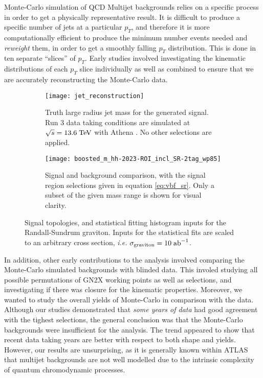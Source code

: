 \documentclass[12pt]{article}
\begin{document}
Monte-Carlo simulation of QCD Multijet backgrounds relies on a specific process
in order to get a physically representative result. It is difficult to produce a
specific number of jets at a particular $p_T$, and therefore it is more
computationally efficient to produce the minimum number events needed and
\textit{reweight} them, in order to get a smoothly falling $p_T$ distribution.
This is done in ten separate ``slices'' of $p_T$. Early studies involved
investigating the kinematic distributions of each $p_T$ slice individually as
well as combined to ensure that we are accurately reconstructing the Monte-Carlo
data.

\begin{figure}[t]
    \centering
    \begin{subfigure}[t]{.48\textwidth}
        \centering
        \texttt{[image: jet\_reconstruction]}
        \caption{Truth large radius jet mass for the generated signal. Run 3
        data taking conditions are simulated at $\sqrt{s}=13.6\;\text{TeV}$ with
        Athena \cite{atlas_simulation}. No other selections are applied.}
        \label{subfig:jet_reconstruction}
    \end{subfigure}
    \hfill
    \begin{subfigure}[t]{.48\textwidth}
        \centering
        \texttt{[image: boosted\_m\_hh-2023-ROI\_incl\_SR-2tag\_wp85]}
        \caption{Signal and background comparison, with the signal region
        selections given in equation \ref{eq:vbf_sr}. Only a subset of the given
        mass range is shown for visual clarity.}
        \label{subfig:input_hists}
    \end{subfigure}
    \caption{Signal topologies, and statistical fitting histogram inputs for the
    Randall-Sundrum graviton. Inputs for the statistical fits are scaled to an
    arbitrary cross section, \textit{i.e.}
    $\sigma_{\text{graviton}}=10\;\text{ab}^{-1}$.}
\label{fig:my_contributions}
\end{figure}

In addition, other early contributions to the analysis involved comparing the
Monte-Carlo simulated backgrounds with blinded data. This involed studying all
possible permutations of GN2X working points as well as selections, and
investigating if there was closure for the kinematic properties. Moreover, we
wanted to study the overall yields of Monte-Carlo in comparison with the data. Although our
studies demonstrated that \textit{some years of data} had good agreement with
the tighest selections, the general conclusion was that the Monte-Carlo
backgrounds were insufficient for the analysis. The trend appeared to show that
recent data taking years are better with respect to both shape and yields.
However, our results are unsurprising, as it is generally known within ATLAS
that multijet backgrounds are not well modelled due to the intrinsic
complexity of quantum chromodynamic processes.
\end{document}
